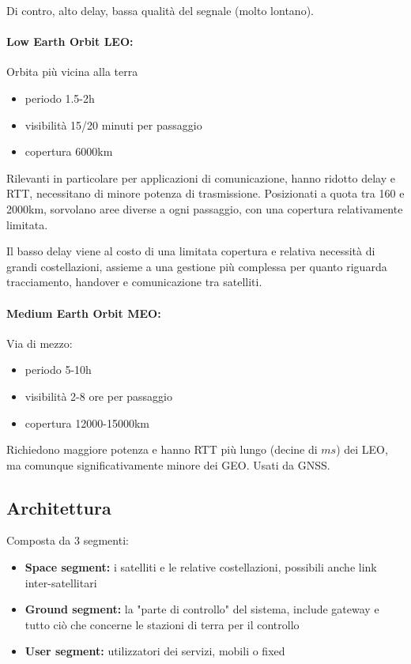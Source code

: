 Di contro, alto delay, bassa qualità del segnale (molto lontano).

\paragraph{Low Earth Orbit LEO:} Orbita più vicina alla terra
\begin{itemize}
    \item periodo 1.5-2h
    
    \item visibilità 15/20 minuti per passaggio
    
    \item copertura 6000km
\end{itemize}

Rilevanti in particolare per applicazioni di comunicazione, hanno ridotto delay e RTT, necessitano di minore potenza di trasmissione. Posizionati a quota tra 160 e 2000km, sorvolano aree diverse a ogni passaggio, con una copertura relativamente limitata.

Il basso delay viene al costo di una limitata copertura e relativa necessità di grandi costellazioni, assieme a una gestione più complessa per quanto riguarda tracciamento, handover e comunicazione tra satelliti.

\paragraph{Medium Earth Orbit MEO:} Via di mezzo:
\begin{itemize}
    \item periodo 5-10h
    
    \item visibilità 2-8 ore per passaggio
    
    \item copertura 12000-15000km
\end{itemize}

Richiedono maggiore potenza e hanno RTT più lungo (decine di $ms$) dei LEO, ma comunque significativamente minore dei GEO. Usati da GNSS.

\subsection{Architettura}

Composta da 3 segmenti: 
\begin{itemize}
    \item \textbf{Space segment:} i satelliti e le relative costellazioni, possibili anche link inter-satellitari
    
    \item \textbf{Ground segment:} la "parte di controllo" del sistema, include gateway e tutto ciò che concerne le stazioni di terra per il controllo
    
    \item \textbf{User segment:} utilizzatori dei servizi, mobili o fixed
\end{itemize}

